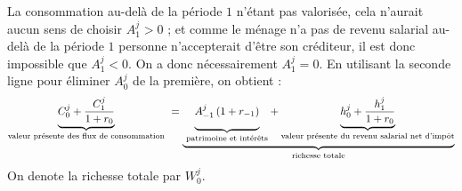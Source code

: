 \documentclass[a4paper,11pt]{article}
\begin{document}
\begin{enumerate}
La consommation au-delà de la période $1$ n'étant pas
valorisée, cela n'aurait aucun sens de choisir $A_{1}^{j}>0$ ; et
comme le ménage n'a pas de revenu salarial au-delà de la période 
$1$ personne n'accepterait d'être son créditeur, il est donc
impossible que $A_{1}^{j}<0$. On a donc nécessairement $A_{1}^{j}=0$. En utilisant la seconde ligne pour éliminer $A^j_{0}$ de la premi\`{e}re,
on obtient :%
\begin{equation}
\underset{\text{valeur présente des flux de consommation}}{\underbrace{C_{0}^{j} + \frac{C_{1}^{j}}{1+r_0}}}\ =\underset{\text{richesse totale}}{\underbrace{\ 
\underset{\text{patrimoine et intérêts}}{\underbrace{\underset{}{%
A_{-1}^{j}\left( 1+r_{-1}\right) }}}+\underset{\text{valeur présente
du revenu salarial net d'imp\^{o}t}}{\underbrace{h_{0}^{j} + \frac{h_{1}^{j}}{1+r_0}}}}}  \label{2 - CBI}
\end{equation}
On denote la richesse totale par $W^j_0$. 

\end{enumerate}
\end{document}
